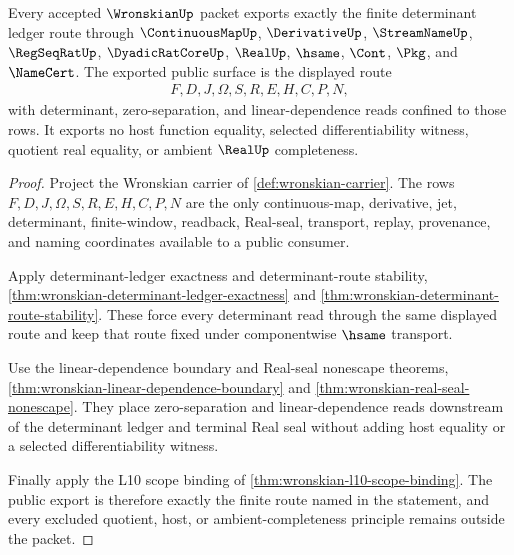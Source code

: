 \begin{theorem}
\label{thm:wronskian-public-determinant-export}
Every accepted $\WronskianUp$ packet exports exactly the finite determinant ledger route through $\ContinuousMapUp$, $\DerivativeUp$, $\StreamNameUp$, $\RegSeqRatUp$, $\DyadicRatCoreUp$, $\RealUp$, $\hsame$, $\Cont$, $\Pkg$, and $\NameCert$. The exported public surface is the displayed route
$$
\begin{gathered}
F,D,J,\Omega,S,R,E,H,C,P,N,
\end{gathered}
$$
with determinant, zero-separation, and linear-dependence reads confined to those rows. It exports no host function equality, selected differentiability witness, quotient real equality, or ambient $\RealUp$ completeness.
\end{theorem}
\begin{proof}
Project the Wronskian carrier of \autoref{def:wronskian-carrier}. The rows $F,D,J,\Omega,S,R,E,H,C,P,N$ are the only continuous-map, derivative, jet, determinant, finite-window, readback, Real-seal, transport, replay, provenance, and naming coordinates available to a public consumer.

Apply determinant-ledger exactness and determinant-route stability, \autoref{thm:wronskian-determinant-ledger-exactness} and \autoref{thm:wronskian-determinant-route-stability}. These force every determinant read through the same displayed route and keep that route fixed under componentwise $\hsame$ transport.

Use the linear-dependence boundary and Real-seal nonescape theorems, \autoref{thm:wronskian-linear-dependence-boundary} and \autoref{thm:wronskian-real-seal-nonescape}. They place zero-separation and linear-dependence reads downstream of the determinant ledger and terminal Real seal without adding host equality or a selected differentiability witness.

Finally apply the L10 scope binding of \autoref{thm:wronskian-l10-scope-binding}. The public export is therefore exactly the finite route named in the statement, and every excluded quotient, host, or ambient-completeness principle remains outside the packet.
\end{proof}

